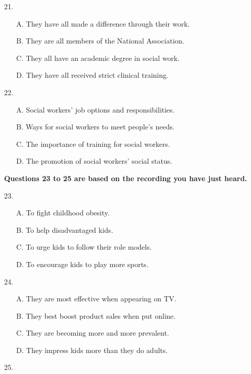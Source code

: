 \documentclass[UTF8,11pt]{ctexart}
\begin{document}
21.


\begin{itemize}[leftmargin=2em,itemsep=.2em,topsep=.4em]\item[A.] They have all made a difference through their work.
\item[B.] They are all members of the National Association.
\item[C.] They all have an academic degree in social work.
\item[D.] They have all received strict clinical training.
\end{itemize}

22.


\begin{itemize}[leftmargin=2em,itemsep=.2em,topsep=.4em]\item[A.] Social workers' job options and responsibilities.
\item[B.] Ways for social workers to meet people's needs.
\item[C.] The importance of training for social workers.
\item[D.] The promotion of social workers' social status.
\end{itemize}

\textbf{Questions 23 to 25 are based on the recording you have just heard.}


23.


\begin{itemize}[leftmargin=2em,itemsep=.2em,topsep=.4em]\item[A.] To fight childhood obesity.
\item[B.] To help disadvantaged kids.
\item[C.] To urge kids to follow their role models.
\item[D.] To encourage kids to play more sports.
\end{itemize}

24.


\begin{itemize}[leftmargin=2em,itemsep=.2em,topsep=.4em]\item[A.] They are most effective when appearing on TV.
\item[B.] They best boost product sales when put online.
\item[C.] They are becoming more and more prevalent.
\item[D.] They impress kids more than they do adults.
\end{itemize}

25.
\end{document}
